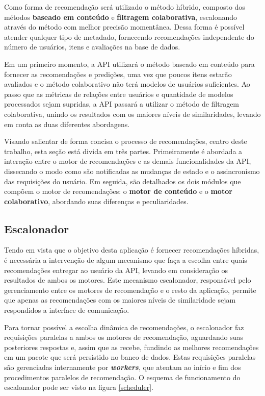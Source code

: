 Como forma de recomendação será utilizado o método híbrido, composto dos métodos \textbf{baseado em conteúdo} e \textbf{filtragem colaborativa}, escalonando através do método com melhor precisão momentânea. Dessa forma é possível atender qualquer tipo de metadado, fornecendo recomendações independente do número de usuários, itens e avaliações na base de dados.

Em um primeiro momento, a API utilizará o método baseado em conteúdo para fornecer as recomendações e predições, uma vez que poucos itens estarão avaliados e o método colaborativo não terá modelos de usuários suficientes. Ao passo que as métricas de relações entre usuários e quantidade de modelos processados sejam supridas, a API passará a utilizar o método de filtragem colaborativa, unindo os resultados com os maiores níveis de similaridades, levando em conta as duas diferentes abordagens.

Visando salientar de forma concisa o processo de recomendações, centro deste trabalho, esta seção está divida em três partes. Primeiramente é abordada a interação entre o motor de recomendações e as demais funcionalidades da API, dissecando o modo como são notificadas as mudanças de estado e o assincronismo das requisições do usuário. Em seguida, são detalhados os dois módulos que compõem o motor de recomendações: o \textbf{motor de conteúdo} e o \textbf{motor colaborativo}, abordando suas diferenças e peculiaridades.

\subsection{Escalonador} \label{motor:async}

Tendo em vista que o objetivo desta aplicação é fornecer recomendações híbridas, é necessária a intervenção de algum mecanismo que faça a escolha entre quais recomendações entregar ao usuário da API, levando em consideração os resultados de ambos os motores. Este mecanismo escalonador, responsável pelo gerenciamento entre os motores de recomendação e o resto da aplicação, permite que apenas as recomendações com os maiores níveis de similaridade sejam respondidos a interface de comunicação.

Para tornar possível a escolha dinâmica de recomendações, o escalonador faz requisições paralelas a ambos os motores de recomendação, aguardando suas posteriores respostas e, assim que as recebe, fundindo as melhores recomendações em um pacote que será persistido no banco de dados. Estas requisições paralelas são gerenciadas internamente por \textit{\textbf{workers}}, que atentam ao início e fim dos procedimentos paralelos de recomendação. O esquema de funcionamento do escalonador pode ser visto na figura \ref{scheduler}.

